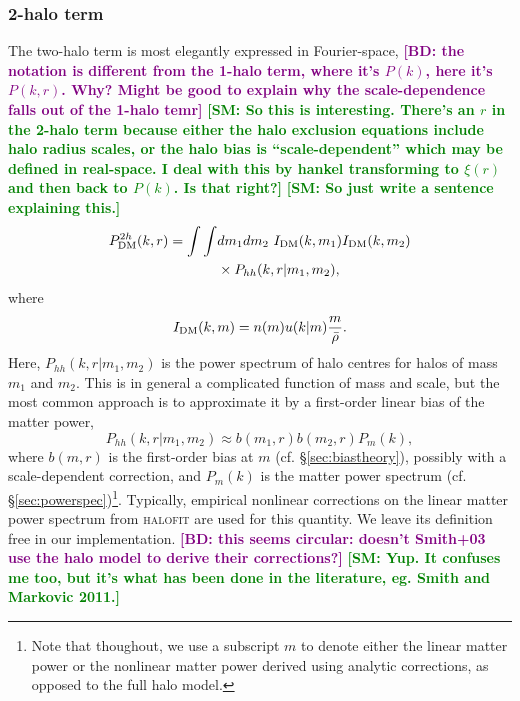\documentclass[5p]{elsarticle}
\newcommand{\bd}[1]{\textcolor{purple}{\textbf{[BD: #1]}}}
\newcommand{\sgm}[1]{\textcolor{green}{\textbf{[SM: #1]}}}
\begin{document}
\subsubsection{2-halo term}
\label{sec:theory:2halo}
The two-halo term is most elegantly expressed in Fourier-space, \bd{the notation is different from the 1-halo term, where it's $P(k)$, here it's $P(k,r)$. Why? Might be good to explain why the scale-dependence falls out of the 1-halo temr}
\sgm{So this is interesting. There's an $r$ in the 2-halo term because either the halo exclusion equations include halo radius scales, or the halo bias is ``scale-dependent'' which may be defined in real-space. I deal with this by hankel transforming to $\xi(r)$ and then back to $P(k)$. Is that right?}
\sgm{So just write a sentence explaining this.}
\begin{align}
    P_{\rm DM}^{2h}(k,r) =  \int \int & dm_1 dm_2\  I_{\rm DM}(k,m_1) I_{\rm DM}(k,m_2) \nonumber \\ 
    &\times P_{hh}(k,r|m_1,m_2),
\end{align}
where
\begin{equation}
    I_{\rm DM}(k,m) = n(m) u(k|m) \frac{m}{\bar{\rho}}.
\end{equation}
Here, $P_{hh}(k,r|m_1,m_2)$ is the power spectrum of halo centres for halos of mass $m_1$ and $m_2$. This is in general a complicated function of mass and scale, but the most common approach is to approximate it by a first-order linear bias of the matter power,
\begin{equation}
    \label{eq:halo_centre_power}
    P_{hh}(k,r|m_1,m_2) \approx b(m_1,r)b(m_2,r)P_m(k),
\end{equation}
where $b(m,r)$ is the first-order bias at $m$ (cf. \S\ref{sec:biastheory}), possibly with a scale-dependent correction, and $P_m(k)$ is the matter power spectrum (cf. \S\ref{sec:powerspec})\footnote{Note that thoughout, we use a subscript $m$ to denote either the linear matter power or the nonlinear matter power derived using analytic corrections, as opposed to the full halo model.}. Typically, empirical nonlinear corrections on the linear matter power spectrum from \textsc{halofit} \citep{Smith2003} are used for this quantity. We leave its definition free in our implementation. \bd{this seems circular: doesn't Smith+03 use the halo model to derive their corrections?} \sgm{Yup. It confuses me too, but it's what has been done in the literature, eg. Smith and Markovic 2011.}
\end{document}
